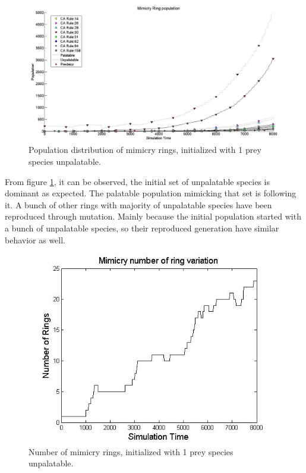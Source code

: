 \documentclass[letterpaper]{article}
\numberwithin{equation}{section}
\begin{document}
\begin{figure}[H]
	\centering
	\includegraphics[scale=0.40]{../tex/images/simTime8k-1Prey-unp}
	\caption[Population distribution of mimicry rings (1 prey species unpalatable)]{Population distribution of mimicry rings, initialized with 1 prey species unpalatable.}
	\label{fig:plot-1-prey-unp}
\end{figure}

From figure \ref{fig:plot-1-prey-unp}, it can be observed, the initial set of unpalatable species is dominant as expected. The palatable population mimicking that set is following it. A bunch of other rings with majority of unpalatable species have been reproduced through mutation. Mainly because the initial population started with a bunch of unpalatable species, so their reproduced generation have similar behavior as well.

\begin{figure}[H]
	\centering
	\includegraphics[scale=0.50]{../tex/images/ringSize8k-1Prey-unp}
	\caption[Number of mimicry rings (1 prey species unpalatable)]{Number of mimicry rings, initialized with 1 prey species unpalatable.}
	\label{fig:ringSize8k-1-Prey-unp}
\end{figure}
\end{document}

